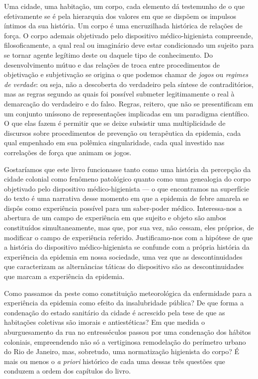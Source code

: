 Uma cidade, uma habitação, um corpo, cada elemento dá testemunho de o
que efetivamente se é pela hierarquia dos valores em que se dispõem os
impulsos íntimos da sua história. Um corpo é uma encruzilhada histórica
de relações de força. O corpo ademais objetivado pelo dispositivo
médico-higienista compreende, filosoficamente, a qual real ou imaginário
deve estar condicionado um sujeito para se tornar agente legítimo deste
ou daquele tipo de conhecimento. Do desenvolvimento mútuo e das relações
de troca entre procedimentos de objetivação e subjetivação se origina o
que podemos chamar de \textit{jogos} ou \textit{regimes de verdade}: ou
seja, não a descoberta do verdadeiro pela síntese de contraditórios, mas
as regras segundo as quais foi possível submeter legitimamente o real à
demarcação do verdadeiro e do falso. Regras, reitero, que não se
presentificam em um conjunto uníssono de representações implicadas em um
paradigma científico. O que elas fazem é permitir que se deixe subsistir
uma multiplicidade de discursos sobre procedimentos de prevenção ou
terapêutica da epidemia, cada qual empenhado em sua polêmica
singularidade, cada qual investido nas correlações de força que animam
os jogos.

\asterisc

Gostaríamos que este livro funcionasse tanto como uma história da
percepção da cidade colonial como fenômeno patológico quanto como uma
genealogia do corpo objetivado pelo dispositivo médico-higienista --- o
que encontramos na superfície do texto é uma narrativa desse momento em
que a epidemia de febre amarela se dispôs como experiência possível para
um saber-poder médico. Interessa-nos a abertura de um campo de
experiência em que sujeito e objeto são ambos constituídos
simultaneamente, mas que, por sua vez, não cessam, eles próprios, de
modificar o campo de experiência referido. Justificamo-nos com a
hipótese de que a história do dispositivo médico-higienista se confunde
com a própria história da experiência da epidemia em nossa sociedade,
uma vez que as descontinuidades que caracterizam as alternâncias táticas
do dispositivo são as descontinuidades que marcam a experiência da
epidemia.

Como passamos da peste como constituição meteorológica da enfermidade
para a experiência da epidemia como efeito da insalubridade pública? De
que forma a condenação do estado sanitário da cidade é acrescido pela
tese de que as habitações coletivas são imorais e antiestéticas? Em que
medida o aburguesamento da rua no entresséculos passou por uma
condenação dos hábitos coloniais, empreendendo não só a vertiginosa
remodelação do perímetro urbano do Rio de Janeiro, mas, sobretudo, uma
normatização higienista do corpo? É mais ou menos o \textit{a priori}
histórico de cada uma dessas três questões que conduzem a ordem dos
capítulos do livro.


